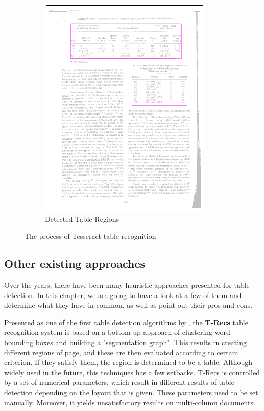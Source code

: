 \begin{figure}[H]
\begin{subfigure}{0.31\textwidth}
\includegraphics[width=\linewidth]{img/tableDetectionResult.pdf}
\caption{Detected Table Regions} \label{fig:1c}
\end{subfigure}

\caption{The process of Tesseract table recognition} \label{fig:1}
\end{figure}

\subsection{Other existing approaches}

Over the years, there have been many heuristic approaches presented for table detection. In this chapter, we are going to have a look at a few of them and determine what they have in common, as well as point out their pros and cons.

Presented as one of the first table detection algorithms by \citet{TRecs}, the \textbf{T-Recs} table recognition system is based on a bottom-up approach of clustering word bounding boxes and building a "segmentation graph". This results in creating different regions of page, and these are then evaluated according to certain criterion. If they satisfy them, the region is determined to be a table. Although widely used in the future, this techniques has a few setbacks. T-Recs is controlled by a set of numerical parameters, which result in different results of table detection depending on the layout that is given. These parameters need to be set manually. Moreover, it yields unsatisfactory results on multi-column documents.

